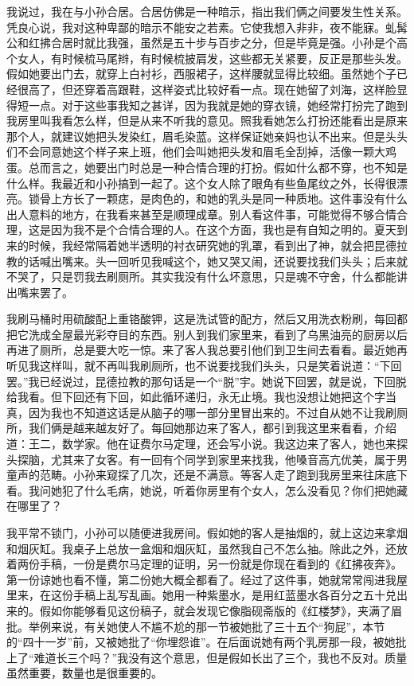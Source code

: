 我说过，我在与小孙合居。合居仿佛是一种暗示，指出我们俩之间要发生性关系。凭良心说，我对这种卑鄙的暗示不能安之若素。它使我想入非非，夜不能寐。虬髯公和红拂合居时就比我强，虽然是五十步与百步之分，但是毕竟是强。小孙是个高个女人，有时候梳马尾辫，有时候梳披肩发，这些都无关紧要，反正是那些头发。假如她要出门去，就穿上白衬衫，西服裙子，这样腰就显得比较细。虽然她个子已经很高了，但还穿着高跟鞋，这样姿式比较好看一点。现在她留了刘海，这样脸显得短一点。对于这些事我知之甚详，因为我就是她的穿衣镜，她经常打扮完了跑到我房里叫我看怎么样，但是从来不听我的意见。照我看她怎么打扮还能看出是原来那个人，就建议她把头发染红，眉毛染蓝。这样保证她亲妈也认不出来。但是头头们不会同意她这个样子来上班，他们会叫她把头发和眉毛全刮掉，活像一颗大鸡蛋。总而言之，她要出门时总是一种合情合理的打扮。假如什么都不穿，也不知是什么样。我最近和小孙搞到一起了。这个女人除了眼角有些鱼尾纹之外，长得很漂亮。锁骨上方长了一颗痣，是肉色的，和她的乳头是同一种质地。这件事没有什么出人意料的地方，在我看来甚至是顺理成章。别人看这件事，可能觉得不够合情合理，这是因为我不是个合情合理的人。在这个方面，我也是有自知之明的。夏天到来的时候，我经常隔着她半透明的衬衣研究她的乳罩，看到出了神，就会把昆德拉教的话喊出嘴来。头一回听见我喊这个，她又哭又闹，还说要找我们头头；后来就不哭了，只是罚我去刷厕所。其实我没有什么坏意思，只是魂不守舍，什么都能讲出嘴来罢了。 

我刷马桶时用硫酸配上重铬酸钾，这是洗试管的配方，然后又用洗衣粉刷，每回都把它洗成全屋最光彩夺目的东西。别人到我们家里来，看到了乌黑油亮的厨房以后再进了厕所，总是要大吃一惊。来了客人我总要引他们到卫生间去看看。最近她再听见我这样叫，就不再叫我刷厕所，也不说要找我们头头，只是笑着说道：“下回罢。”我已经说过，昆德拉教的那句话是一个“脱”宇。她说下回罢，就是说，下回脱给我看。但下回还有下回，如此循环递归，永无止境。我也没想让她把这个字当真，因为我也不知道这话是从脑子的哪一部分里冒出来的。不过自从她不让我刷厕所，我们俩是越来越友好了。每回她那边来了客人，都引到我这里来看看，介绍道：王二，数学家。他在证费尔马定理，还会写小说。我这边来了客人，她也来探头探脑，尤其来了女客。有一回有个同学到家里来找我，他嗓音高亢优美，属于男童声的范畴。小孙来窥探了几次，还是不满意。等客人走了跑到我房里来往床底下看。我问她犯了什么毛病，她说，听着你房里有个女人，怎么没看见？你们把她藏在哪里了？ 

我平常不锁门，小孙可以随便进我房间。假如她的客人是抽烟的，就上这边来拿烟和烟灰缸。我桌子上总放一盒烟和烟灰缸，虽然我自己不怎么抽。除此之外，还放着两份手稿，一份是费尔马定理的证明，另一份就是你现在看到的《红拂夜奔》。第一份谅她也看不懂，第二份她大概全都看了。经过了这件事，她就常常闯进我屋里来，在这份手稿上乱写乱画。她用一种紫墨水，是用红蓝墨水各百分之五十兑出来的。假如你能够看见这份稿子，就会发现它像脂砚斋版的《红楼梦》，夹满了眉批。举例来说，有关她使人不尴不尬的那一节被她批了三十五个“狗屁”，本节的“四十一岁”前，又被她批了“你埋怨谁”。在后面说她有两个乳房那一段，被她批上了“难道长三个吗？”我没有这个意思，但是假如长出了三个，我也不反对。质量虽然重要，数量也是很重要的。 

